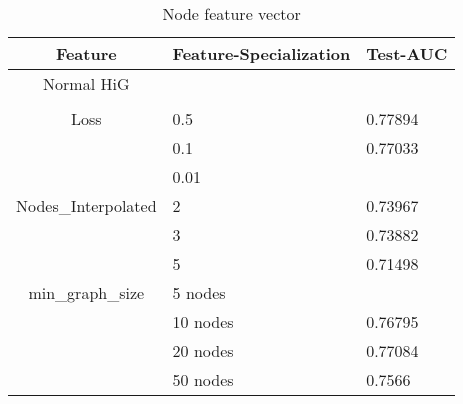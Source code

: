\begin{table}
    \centering
    \caption{Node feature vector}
    \label{node_features}
    \begin{tabular}{c || l| p{6cm} |}
        Feature & Feature-Specialization& Test-AUC                                                 \\
        \hline
        \hline
        Normal HiG&   &        \\
	\hline                                               \\
        Loss & 0.5 & 0.77894 \\
             & 0.1 & 0.77033                                               \\
             & 0.01 &                                                \\
	\hline
        Nodes_Interpolated & 2             & 0.73967                                                 \\
             & 3            & 0.73882                                                  \\
             & 5                 & 0.71498                              \\
	\hline
            min_graph_size & 5 nodes                   &                                                   \\
             & 10 nodes                   & 0.76795    \\
             & 20 nodes                   & 0.77084    \\
             & 50 nodes                   & 0.7566                                                  \\
    \end{tabular}
\end{table}
